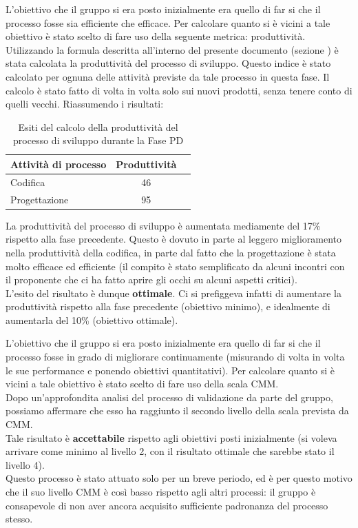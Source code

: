 				L'obiettivo che il gruppo si era posto inizialmente era quello di far si che il processo fosse sia efficiente che efficace. Per calcolare quanto si è vicini a tale obiettivo è stato scelto di fare uso della seguente metrica: produttività.\\
				Utilizzando la formula descritta all'interno del presente documento (sezione ) è stata calcolata la produttività del processo di sviluppo. Questo indice è stato calcolato per ognuna delle attività previste da tale processo in questa fase. Il calcolo è stato fatto di volta in volta solo sui nuovi prodotti, senza tenere conto di quelli vecchi. Riassumendo i risultati:
				\begin{table}[H]
			    	\centering
					\begin{tabu}{| l | c | c |}
						\hline
						Attività di processo   & Produttività   \\ \hline \hline
						Codifica               & 46             \\ \hline
						Progettazione          & 95             \\ \hline
					\end{tabu}
				\caption{Esiti del calcolo della produttività del processo di sviluppo durante la Fase PD}
				\end{table}
				La produttività del processo di sviluppo è aumentata mediamente del 17\% rispetto alla fase precedente. Questo è dovuto in parte al leggero miglioramento nella produttività della codifica, in parte dal fatto che la progettazione è stata molto efficace ed efficiente (il compito è stato semplificato da alcuni incontri con il proponente che ci ha fatto aprire gli occhi su alcuni aspetti critici).\\
				L'esito del risultato è dunque \textbf{ottimale}. Ci si prefiggeva infatti di aumentare la produttività rispetto alla fase precedente (obiettivo minimo), e idealmente di aumentarla del 10\% (obiettivo ottimale).
			
				L'obiettivo che il gruppo si era posto inizialmente era quello di far si che il processo fosse in grado di migliorare continuamente (misurando di volta in volta le sue performance e ponendo obiettivi quantitativi). Per calcolare quanto si è vicini a tale obiettivo è stato scelto di fare uso della scala CMM.\\
				Dopo un'approfondita analisi del processo di validazione da parte del gruppo, possiamo affermare che esso ha raggiunto il secondo livello della scala prevista da CMM.\\
				Tale risultato è \textbf{accettabile} rispetto agli obiettivi posti inizialmente (si voleva arrivare come minimo al livello 2, con il risultato ottimale che sarebbe stato il livello 4).\\
				Questo processo è stato attuato solo per un breve periodo, ed è per questo motivo che il suo livello CMM è così basso rispetto agli altri processi: il gruppo è consapevole di non aver ancora acquisito sufficiente padronanza del processo stesso.
			
